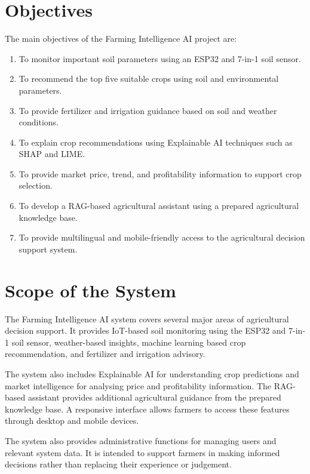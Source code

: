 
\section{Objectives}

The main objectives of the Farming Intelligence AI project are:

\begin{enumerate}
    \item To monitor important soil parameters using an ESP32 and 7-in-1 soil sensor.
    
    \item To recommend the top five suitable crops using soil and environmental parameters.
    
    \item To provide fertilizer and irrigation guidance based on soil and weather conditions.
    
    \item To explain crop recommendations using Explainable AI techniques such as SHAP and LIME.
    
    \item To provide market price, trend, and profitability information to support crop selection.
    
    \item To develop a RAG-based agricultural assistant using a prepared agricultural knowledge base.
    
    \item To provide multilingual and mobile-friendly access to the agricultural decision support system.
\end{enumerate}

\section{Scope of the System}

The Farming Intelligence AI system covers several major areas of agricultural decision support. It provides IoT-based soil monitoring using the ESP32 and 7-in-1 soil sensor, weather-based insights, machine learning based crop recommendation, and fertilizer and irrigation advisory.

The system also includes Explainable AI for understanding crop predictions and market intelligence for analysing price and profitability information. The RAG-based assistant provides additional agricultural guidance from the prepared knowledge base. A responsive interface allows farmers to access these features through desktop and mobile devices.

The system also provides administrative functions for managing users and relevant system data. It is intended to support farmers in making informed decisions rather than replacing their experience or judgement. 